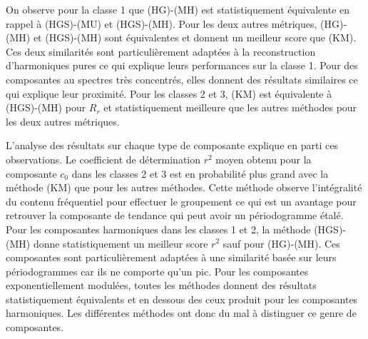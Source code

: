 \documentclass{gretsi}
\begin{document}
\begin{sloppypar}
On observe pour la classe 1 que (HG)-(MH) est statistiquement équivalente en rappel à (HGS)-(MU) et (HGS)-(MH). 
Pour les deux autres métriques, (HG)-(MH) et (HGS)-(MH) sont équivalentes et donnent un meilleur score que (KM).
Ces deux similarités sont particulièrement adaptées à la reconstruction d'harmoniques pures ce qui explique leurs performances sur la classe 1. 
Pour des composantes au spectres très concentrés, elles donnent des résultats similaires ce qui explique leur proximité.
Pour les classes 2 et 3, (KM) est équivalente à (HGS)-(MH) pour $R_r$ et statistiquement meilleure que les autres méthodes pour les deux autres métriques.

L'analyse des résultats sur chaque type de composante explique en parti ces observations.
Le coefficient de détermination $r^2$ moyen obtenu pour la composante $c_0$ dans les classes 2 et 3 est en probabilité plus grand avec la méthode (KM) que pour les autres méthodes. 
Cette méthode observe l'intégralité du contenu fréquentiel pour effectuer le groupement ce qui est un avantage pour retrouver la composante de tendance qui peut avoir un périodogramme étalé. 
Pour les composantes harmoniques dans les classes 1 et 2, la méthode (HGS)-(MH) donne statistiquement un meilleur score $r^2$ sauf pour (HG)-(MH). 
Ces composantes sont particulièrement adaptées à une similarité basée sur leurs périodogrammes car ils ne comporte qu'un pic.
Pour les composantes exponentiellement modulées, toutes les méthodes donnent des résultats statistiquement équivalents et en dessous des ceux produit pour les composantes harmoniques.
Les différentes méthodes ont donc du mal à distinguer ce genre de composantes.
\end{sloppypar}
\end{document}
